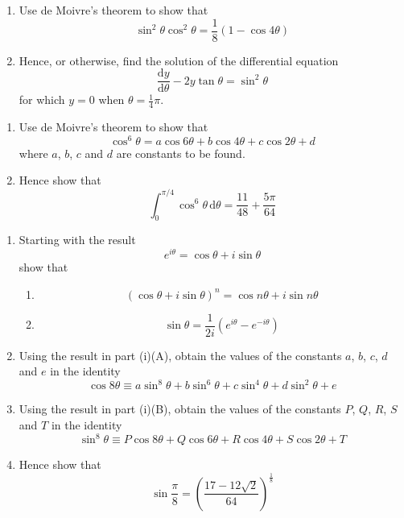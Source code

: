 \documentclass[leqno]{article}
\begin{document}
\begin{enumerate}[
  label=\textbf{\arabic*.},
  leftmargin=*,
  topsep=0pt,
  partopsep=0pt,
  parsep=0pt
]
\begin{enumerate}[label=\textbf{(\alph*)}]
  \item Use de Moivre's theorem to show that
  \[
  \sin^2 \theta \cos^2 \theta = \frac{1}{8}(1-\cos 4\theta)
  \]
  \item Hence, or otherwise, find the solution of the differential equation
  \[
  \frac{\mathrm{d}y}{\mathrm{d}\theta} - 2y\tan \theta = \sin^2 \theta
  \]
  for which $y=0$ when $\theta=\frac{1}{4}\pi$.  \\
\end{enumerate}

\newpage

\questionitem

\begin{enumerate}[label=\textbf{(\alph*)}]
  \item Use de Moivre's theorem to show that
  \[
  \cos^6 \theta = a \cos 6\theta + b \cos 4\theta + c \cos 2\theta + d
  \]
  where $a$, $b$, $c$ and $d$ are constants to be found.  \\
  \item Hence show that
  \[
  \int_0^{\pi/4} \cos^6 \theta \, \mathrm{d}\theta = \frac{11}{48} + \frac{5\pi}{64}
  \]
\end{enumerate}

\newpage


\questionitem

\begin{enumerate}[label=\textbf{(\roman*)}]
  \item Starting with the result
  \[
  e^{i\theta}=\cos\theta+i\sin\theta
  \]
  show that
  \begin{enumerate}[label=(\Alph*)]
    \item
    \[
    \left(\cos\theta+i\sin\theta\right)^n=\cos n\theta+i\sin n\theta
    \]
    \item
    \[
    \sin\theta=\frac{1}{2i}\left(e^{i\theta}-e^{-i\theta}\right)
    \]
  \end{enumerate}
  \item Using the result in part (i)(A), obtain the values of the constants $a$, $b$, $c$, $d$ and $e$ in the identity
  \[
  \cos 8\theta \equiv a\sin^8\theta+b\sin^6\theta+c\sin^4\theta+d\sin^2\theta+e
  \]
  \item Using the result in part (i)(B), obtain the values of the constants $P$, $Q$, $R$, $S$ and $T$ in the identity
  \[
  \sin^8\theta \equiv P\cos 8\theta+Q\cos 6\theta+R\cos 4\theta+S\cos 2\theta+T
  \]
  \item Hence show that
  \[
  \sin \frac{\pi}{8}=\left(\frac{17-12\sqrt{2}}{64}\right)^{\frac{1}{8}}
  \]
\end{enumerate}


\end{enumerate}
\end{document}
